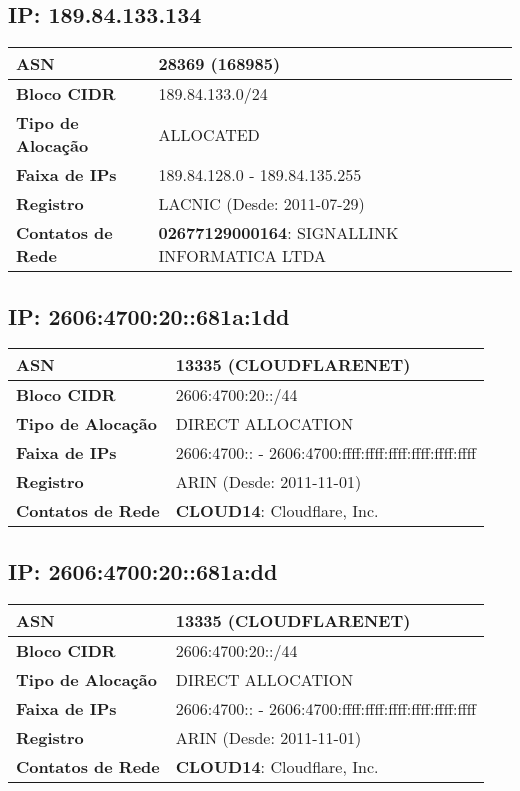     \subsection{IP: 189.84.133.134}
    \begin{tabular}{|l|l|}
    \hline
    \textbf{ASN} & 28369 (168985) \\ \hline
    \textbf{Bloco CIDR} & 189.84.133.0/24 \\ \hline
    \textbf{Tipo de Alocação} & ALLOCATED \\ \hline
    \textbf{Faixa de IPs} & 189.84.128.0 - 189.84.135.255 \\ \hline
    \textbf{Registro} & LACNIC (Desde: 2011-07-29) \\ \hline
        
\textbf{Contatos de Rede} & \textbf{02677129000164}: SIGNALLINK INFORMATICA LTDA 
\\ \hline
\end{tabular}


    \subsection{IP: 2606:4700:20::681a:1dd}
    \begin{tabular}{|l|l|}
    \hline
    \textbf{ASN} & 13335 (CLOUDFLARENET) \\ \hline
    \textbf{Bloco CIDR} & 2606:4700:20::/44 \\ \hline
    \textbf{Tipo de Alocação} & DIRECT ALLOCATION \\ \hline
    \textbf{Faixa de IPs} & 2606:4700:: - 2606:4700:ffff:ffff:ffff:ffff:ffff:ffff \\ \hline
    \textbf{Registro} & ARIN (Desde: 2011-11-01) \\ \hline
        
\textbf{Contatos de Rede} & \textbf{CLOUD14}: Cloudflare, Inc. 
\\ \hline
\end{tabular}


    \subsection{IP: 2606:4700:20::681a:dd}
    \begin{tabular}{|l|l|}
    \hline
    \textbf{ASN} & 13335 (CLOUDFLARENET) \\ \hline
    \textbf{Bloco CIDR} & 2606:4700:20::/44 \\ \hline
    \textbf{Tipo de Alocação} & DIRECT ALLOCATION \\ \hline
    \textbf{Faixa de IPs} & 2606:4700:: - 2606:4700:ffff:ffff:ffff:ffff:ffff:ffff \\ \hline
    \textbf{Registro} & ARIN (Desde: 2011-11-01) \\ \hline
        
\textbf{Contatos de Rede} & \textbf{CLOUD14}: Cloudflare, Inc. 
\\ \hline
\end{tabular}


